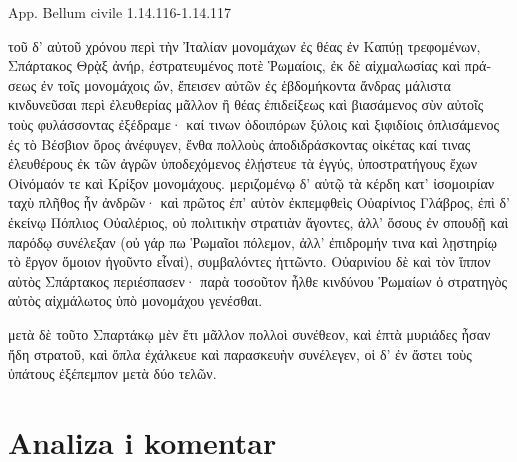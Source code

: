 App. Bellum civile 1.14.116-1.14.117


\medskip


{\large

\begin{greek}

\noindent  τοῦ δ' αὐτοῦ χρόνου περὶ τὴν Ἰταλίαν μονομάχων ἐς θέας ἐν Καπύῃ τρεφομένων, Σπάρτακος Θρᾲξ ἀνήρ, ἐστρατευμένος ποτὲ Ῥωμαίοις, ἐκ δὲ αἰχμαλωσίας καὶ πράσεως ἐν τοῖς μονομάχοις ὤν, ἔπεισεν αὐτῶν ἐς ἑβδομήκοντα ἄνδρας μάλιστα κινδυνεῦσαι περὶ ἐλευθερίας μᾶλλον ἢ θέας ἐπιδείξεως καὶ βιασάμενος σὺν αὐτοῖς τοὺς φυλάσσοντας ἐξέδραμε· καί τινων ὁδοιπόρων ξύλοις καὶ ξιφιδίοις ὁπλισάμενος ἐς τὸ Βέσβιον ὄρος ἀνέφυγεν, ἔνθα πολλοὺς ἀποδιδράσκοντας οἰκέτας καί τινας ἐλευθέρους ἐκ τῶν ἀγρῶν ὑποδεχόμενος ἐλῄστευε τὰ ἐγγύς, ὑποστρατήγους ἔχων Οἰνόμαόν τε καὶ Κρίξον μονομάχους. μεριζομένῳ δ' αὐτῷ τὰ κέρδη κατ' ἰσομοιρίαν ταχὺ πλῆθος ἦν ἀνδρῶν· καὶ πρῶτος ἐπ' αὐτὸν ἐκπεμφθεὶς Οὐαρίνιος Γλάβρος, ἐπὶ δ' ἐκείνῳ Πόπλιος Οὐαλέριος, οὐ πολιτικὴν στρατιὰν ἄγοντες, ἀλλ' ὅσους ἐν σπουδῇ καὶ παρόδῳ συνέλεξαν (οὐ γάρ πω Ῥωμαῖοι πόλεμον, ἀλλ' ἐπιδρομήν τινα καὶ λῃστηρίῳ τὸ ἔργον ὅμοιον ἡγοῦντο εἶναἰ), συμβαλόντες ἡττῶντο. Οὐαρινίου δὲ καὶ τὸν ἵππον αὐτὸς Σπάρτακος περιέσπασεν· παρὰ τοσοῦτον ἦλθε κινδύνου Ῥωμαίων ὁ στρατηγὸς αὐτὸς αἰχμάλωτος ὑπὸ μονομάχου γενέσθαι.

μετὰ δὲ τοῦτο Σπαρτάκῳ μὲν ἔτι μᾶλλον πολλοὶ συνέθεον, καὶ ἑπτὰ μυριάδες ἦσαν ἤδη στρατοῦ, καὶ ὅπλα ἐχάλκευε καὶ παρασκευὴν συνέλεγεν, οἱ δ' ἐν ἄστει τοὺς ὑπάτους ἐξέπεμπον μετὰ δύο τελῶν.

\end{greek}

}


\section*{Analiza i komentar}


